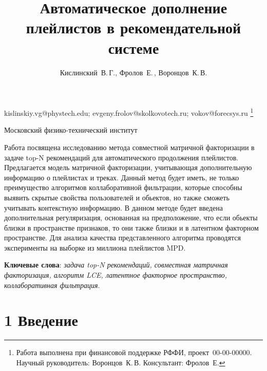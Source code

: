 \documentclass[12pt,twoside]{article}
\begin{document}
\title
    {Автоматическое дополнение плейлистов в рекомендательной системе}
\author
    {Кислинский~В.\,Г., Фролов~Е.\,, Воронцов~К.\,В.} %
\email
    {kislinskiy.vg@phystech.edu; evgeny.frolov@skolkovotech.ru; vokov@forecsys.ru}
\thanks
    {Работа выполнена при финансовой поддержке РФФИ, проект \No\,00-00-00000.
     Научный руководитель:  Воронцов~К.\,В.
     Консультант:  Фролов~Е.}

\organization
    {Московский физико-технический институт}
\abstract
	{Работа посвящена исследованию метода совместной матричной факторизации в задаче top-N рекомендаций для автоматического продолжения плейлистов. Предлагается  модель матричной факторизации, учитывающая дополнительную информацию о плейлистах и треках. Данный метод будет иметь, не только преимущество алгоритмов коллаборативной фильтрации, которые способны выявить скрытые свойства пользователей и обьектов,  но также сможеть учитывать контекстную информацию. В данном методе будет введена дополнительная регуляризация, основанная на предположение, что если обьекты близки в пространстве признаков, то они также близки и в латентном факторном пространстве. Для анализа качества представленного алгоритма проводятся эксперименты на выборке  из миллиона плейлистов MPD. 

\bigskip
\textbf{Ключевые слова}: \emph {задача top-N рекомендаций, совместная матричная факторизация, алгоритм LCE, латентное факторное пространство, коллаборативная фильтрация}.

}

\maketitle

\section{1 Введение}
\end{document}
